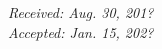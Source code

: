 \documentclass[article,10pt,twoside,a4paper,twocolumn,hidelinks,english,brazil]{abntex2}
\newcommand{\datarecebidoen}{Aug. 30, 201?} %
\newcommand{\dataaceitoen}{Jan. 15, 202?} %
\begin{document}
\begin{flushright}
    \SingleSpacing
    \textit{Received:  \datarecebidoen} \\
    \textit{Accepted:  \dataaceitoen} \\
\end{flushright}

\end{document}
